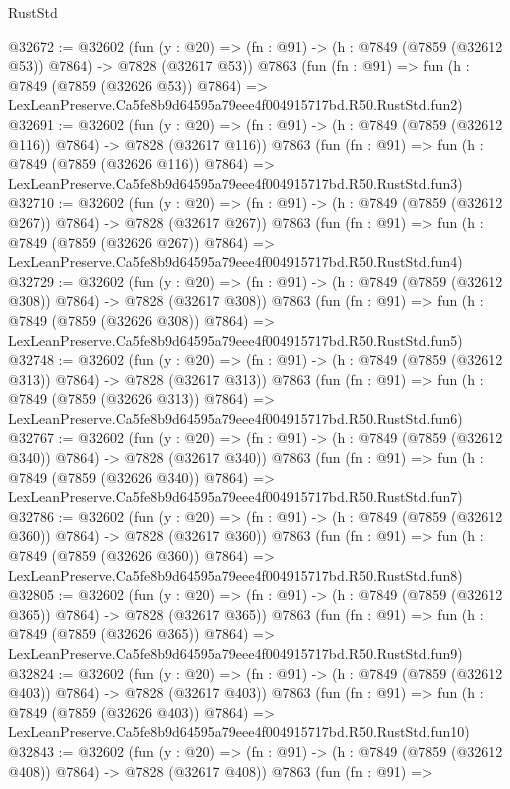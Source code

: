 \begin{lexlean}{RustStd}
\begin{coremodule}
@32672 := @32602
    (fun (y : @20) => (fn : @91) -> (h : @7849 (@7859 (@32612 @53)) @7864) -> @7828 (@32617 @53))
    @7863
    (fun (fn : @91) =>
    fun (h : @7849 (@7859 (@32626 @53)) @7864) =>
    LexLeanPreserve.Ca5fe8b9d64595a79eee4f004915717bd.R50.RustStd.fun2)
@32691 := @32602
    (fun (y : @20) => (fn : @91) -> (h : @7849 (@7859 (@32612 @116)) @7864) -> @7828 (@32617 @116))
    @7863
    (fun (fn : @91) =>
    fun (h : @7849 (@7859 (@32626 @116)) @7864) =>
    LexLeanPreserve.Ca5fe8b9d64595a79eee4f004915717bd.R50.RustStd.fun3)
@32710 := @32602
    (fun (y : @20) => (fn : @91) -> (h : @7849 (@7859 (@32612 @267)) @7864) -> @7828 (@32617 @267))
    @7863
    (fun (fn : @91) =>
    fun (h : @7849 (@7859 (@32626 @267)) @7864) =>
    LexLeanPreserve.Ca5fe8b9d64595a79eee4f004915717bd.R50.RustStd.fun4)
@32729 := @32602
    (fun (y : @20) => (fn : @91) -> (h : @7849 (@7859 (@32612 @308)) @7864) -> @7828 (@32617 @308))
    @7863
    (fun (fn : @91) =>
    fun (h : @7849 (@7859 (@32626 @308)) @7864) =>
    LexLeanPreserve.Ca5fe8b9d64595a79eee4f004915717bd.R50.RustStd.fun5)
@32748 := @32602
    (fun (y : @20) => (fn : @91) -> (h : @7849 (@7859 (@32612 @313)) @7864) -> @7828 (@32617 @313))
    @7863
    (fun (fn : @91) =>
    fun (h : @7849 (@7859 (@32626 @313)) @7864) =>
    LexLeanPreserve.Ca5fe8b9d64595a79eee4f004915717bd.R50.RustStd.fun6)
@32767 := @32602
    (fun (y : @20) => (fn : @91) -> (h : @7849 (@7859 (@32612 @340)) @7864) -> @7828 (@32617 @340))
    @7863
    (fun (fn : @91) =>
    fun (h : @7849 (@7859 (@32626 @340)) @7864) =>
    LexLeanPreserve.Ca5fe8b9d64595a79eee4f004915717bd.R50.RustStd.fun7)
@32786 := @32602
    (fun (y : @20) => (fn : @91) -> (h : @7849 (@7859 (@32612 @360)) @7864) -> @7828 (@32617 @360))
    @7863
    (fun (fn : @91) =>
    fun (h : @7849 (@7859 (@32626 @360)) @7864) =>
    LexLeanPreserve.Ca5fe8b9d64595a79eee4f004915717bd.R50.RustStd.fun8)
@32805 := @32602
    (fun (y : @20) => (fn : @91) -> (h : @7849 (@7859 (@32612 @365)) @7864) -> @7828 (@32617 @365))
    @7863
    (fun (fn : @91) =>
    fun (h : @7849 (@7859 (@32626 @365)) @7864) =>
    LexLeanPreserve.Ca5fe8b9d64595a79eee4f004915717bd.R50.RustStd.fun9)
@32824 := @32602
    (fun (y : @20) => (fn : @91) -> (h : @7849 (@7859 (@32612 @403)) @7864) -> @7828 (@32617 @403))
    @7863
    (fun (fn : @91) =>
    fun (h : @7849 (@7859 (@32626 @403)) @7864) =>
    LexLeanPreserve.Ca5fe8b9d64595a79eee4f004915717bd.R50.RustStd.fun10)
@32843 := @32602
    (fun (y : @20) => (fn : @91) -> (h : @7849 (@7859 (@32612 @408)) @7864) -> @7828 (@32617 @408))
    @7863
    (fun (fn : @91) =>

\end{coremodule}
\end{lexlean}

